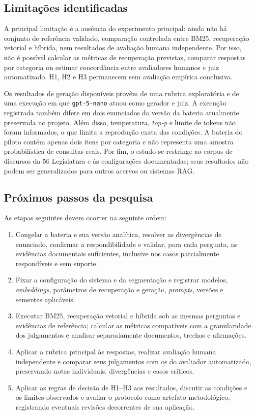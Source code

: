 \subsection{Limitações identificadas}

A principal limitação é a ausência do experimento principal: ainda não há conjunto de referência validado, comparação controlada entre BM25, recuperação vetorial e híbrida, nem resultados de avaliação humana independente. Por isso, não é possível calcular as métricas de recuperação previstas, comparar respostas por categoria ou estimar concordância entre avaliadores humanos e juiz automatizado. H1, H2 e H3 permanecem sem avaliação empírica conclusiva.

Os resultados de geração disponíveis provêm de uma rubrica exploratória e de uma execução em que \texttt{gpt-5-nano} atuou como gerador e juiz. A execução registrada também difere em dois enunciados da versão da bateria atualmente preservada no projeto. Além disso, temperatura, \textit{top-p} e limite de tokens não foram informados, o que limita a reprodução exata das condições. A bateria do piloto contém apenas dois itens por categoria e não representa uma amostra probabilística de consultas reais. Por fim, o estudo se restringe ao corpus de discursos da 56\textordfeminine{} Legislatura e às configurações documentadas; seus resultados não podem ser generalizados para outros acervos ou sistemas RAG.

\subsection{Próximos passos da pesquisa}

As etapas seguintes devem ocorrer na seguinte ordem:

\begin{enumerate}
  \item Congelar a bateria e sua versão analítica, resolver as divergências de enunciado, confirmar a respondibilidade e validar, para cada pergunta, as evidências documentais suficientes, inclusive nos casos parcialmente respondíveis e sem suporte.
  \item Fixar a configuração do sistema e da segmentação e registrar modelos, \textit{embeddings}, parâmetros de recuperação e geração, \textit{prompts}, versões e sementes aplicáveis.
  \item Executar BM25, recuperação vetorial e híbrida sob as mesmas perguntas e evidências de referência; calcular as métricas compatíveis com a granularidade dos julgamentos e analisar separadamente documentos, trechos e afirmações.
  \item Aplicar a rubrica principal às respostas, realizar avaliação humana independente e comparar seus julgamentos com os do avaliador automatizado, preservando notas individuais, divergências e casos críticos.
  \item Aplicar as regras de decisão de H1--H3 aos resultados, discutir as condições e os limites observados e avaliar o protocolo como artefato metodológico, registrando eventuais revisões decorrentes de sua aplicação.
\end{enumerate}

